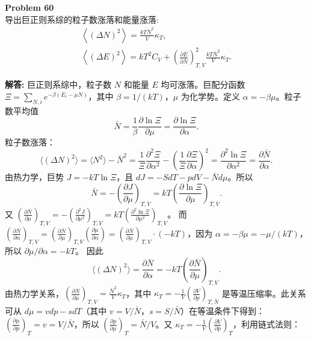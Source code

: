 \documentclass[12pt, a4paper, oneside]{ctexart}
\newenvironment{solution}{\par\noindent\textbf{解答:}\quad}{\par}
\begin{document}
\begin{mdframed}[backgroundcolor=gray!10, linewidth=0pt]
    \textbf{Problem 60} \\
    导出巨正则系综的粒子数涨落和能量涨落:
    \[
    \begin{gathered}
        \left\langle (\Delta N)^2 \right\rangle = \frac{k T \bar{N}^2}{V} \kappa_T, \\
        \left\langle (\Delta E)^2 \right\rangle = k T^2 C_V + \left( \frac{\partial \bar{E}}{\partial \bar{N}} \right)_{T,V}^2 \frac{k T \bar{N}^2}{V} \kappa_T.
    \end{gathered}
    \]
\end{mdframed}
\begin{solution}
    巨正则系综中，粒子数 $N$ 和能量 $E$ 均可涨落。巨配分函数 $\Xi = \sum_{N,i} e^{-\beta (E_i - \mu N)}$，其中 $\beta = 1/(kT)$，$\mu$ 为化学势。定义 $\alpha = -\beta \mu$。粒子数平均值
    \[
    \bar{N} = \frac{1}{\beta} \frac{\partial \ln \Xi}{\partial \mu} = \frac{\partial \ln \Xi}{\partial \alpha}.
    \]
    粒子数涨落：
    \[
    \langle (\Delta N)^2 \rangle = \langle N^2 \rangle - \bar{N}^2 = \frac{1}{\Xi} \frac{\partial^2 \Xi}{\partial \alpha^2} - \left( \frac{1}{\Xi} \frac{\partial \Xi}{\partial \alpha} \right)^2 = \frac{\partial^2 \ln \Xi}{\partial \alpha^2} = \frac{\partial \bar{N}}{\partial \alpha}.
    \]
    由热力学，巨势 $J = -kT \ln \Xi$，且 $dJ = -S dT - p dV - \bar{N} d\mu$。所以
    \[
    \bar{N} = -\left( \frac{\partial J}{\partial \mu} \right)_{T,V} = kT \left( \frac{\partial \ln \Xi}{\partial \mu} \right)_{T,V}.
    \]
    又 $\left( \frac{\partial \bar{N}}{\partial \mu} \right)_{T,V} = - \left( \frac{\partial^2 J}{\partial \mu^2} \right)_{T,V} = kT \left( \frac{\partial^2 \ln \Xi}{\partial \mu^2} \right)_{T,V}$。
    而 $\left( \frac{\partial \bar{N}}{\partial \alpha} \right)_{T,V} = \left( \frac{\partial \bar{N}}{\partial \mu} \right)_{T,V} \left( \frac{\partial \mu}{\partial \alpha} \right) = \left( \frac{\partial \bar{N}}{\partial \mu} \right)_{T,V} \cdot (-kT)$，因为 $\alpha = -\beta \mu = -\mu/(kT)$，所以 $\partial \mu / \partial \alpha = -kT$。
    因此
    \[
    \langle (\Delta N)^2 \rangle = \frac{\partial \bar{N}}{\partial \alpha} = -kT \left( \frac{\partial \bar{N}}{\partial \mu} \right)_{T,V}.
    \]
    由热力学关系，$\left( \frac{\partial \bar{N}}{\partial \mu} \right)_{T,V} = \frac{\bar{N}^2}{V} \kappa_T$，其中 $\kappa_T = -\frac{1}{V} \left( \frac{\partial V}{\partial p} \right)_{T,\bar{N}}$ 是等温压缩率。此关系可从 $d\mu = v dp - s dT$（其中 $v = V/\bar{N}$，$s = S/\bar{N}$）在等温条件下得到：$\left( \frac{\partial \mu}{\partial p} \right)_T = v = V/\bar{N}$，所以 $\left( \frac{\partial p}{\partial \mu} \right)_T = \bar{N}/V$。又 $\kappa_T = -\frac{1}{V} \left( \frac{\partial V}{\partial p} \right)_T$，利用链式法则：

\end{solution}
\end{document}
